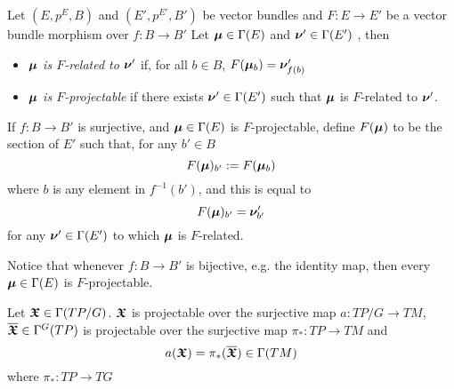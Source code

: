 \begin{definition}\label{defnRelatedProjectable}
Let $(E, p^E, B)$ and $(E', p^{E'}, B')$ be vector bundles and $F: E \to E'$ be a vector bundle morphism over $f: B \to B'$ Let $\bm{\mu} \in \Gamma(E)$ and $\bm{\nu}' \in \Gamma(E')$ , then
    \begin{itemize}
        
    \item \emph{$\bm{\mu}$ is $F$-related to $\bm{\nu}'$} if, for all $b \in B$, $F(\bm{\mu}_b) = \bm{\nu}'_{f(b)}$
    
    \item \emph{$\bm{\mu}$ is $F$-projectable} if there exists $\bm{\nu}' \in \Gamma(E')$ such that $\bm{\mu}$ is $F$-related to $\bm{\nu}'$.
    
    \end{itemize}
    
If $f:B \to B'$ is surjective, and $\bm{\mu} \in \Gamma(E)$ is $F$-projectable, define $F(\bm{\mu})$ to be the section of $E'$ such that, for any $b' \in B$
\begin{equation} \label{funOfSection}
    F(\bm{\mu})_{b'} := F(\bm{\mu}_b)
\end{equation} where $b$ is any element in $f^{-1}(b')$, and this is equal to \[F(\bm{\mu})_{b'} = \bm{\nu}'_{b'}\] for any $\bm{\nu}' \in \Gamma(E')$ to which $\bm{\mu}$ is $F$-related.

Notice that whenever $f: B \to B'$ is bijective, e.g. the identity map, then every $\bm{\mu} \in \Gamma(E)$ is $F$-projectable.

\end{definition}

\begin{theorem} \label{theoAnchorUpsect}
Let $\bm{\mathfrak{X}} \in \Gamma(TP/G)$. $\bm{\mathfrak{X}}$ is projectable over the surjective map $a: TP/G \to TM$, $\overline{\bm{\mathfrak{X}}} \in \Gamma^G(TP)$ is projectable over the surjective map $\pi_*: TP \to TM$ and
\begin{equation} \label{theoAnchorUpsectEqn}
    a(\bm{\mathfrak{X}}) = \pi_*(\overline{\bm{\mathfrak{X}}}) \in \Gamma(TM)
\end{equation} where $\pi_*: TP \to TG$
\end{theorem}

